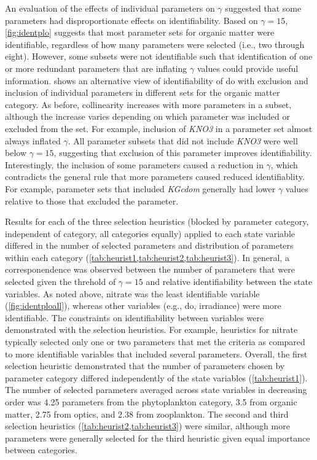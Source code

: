 \documentclass[review]{elsarticle}\usepackage[]{graphicx}\usepackage[]{color}
\begin{document}
An evaluation of the effects of individual parameters on $\gamma$ suggested that some parameters had disproportionate effects on identifiability.  Based on $\gamma = 15$, \cref{fig:identplo} suggests that most parameter sets for organic matter were identifiable, regardless of how many parameters were selected (i.e., two through eight).  However, some subsets were not identifiable such that identification of one or more redundant parameters that are inflating $\gamma$ values could provide useful information.   shows an alternative view of identifiability of \ac{do} with exclusion and inclusion of individual parameters in different sets for the organic matter category.  As before, collinearity increases with more parameters in a subset, although the increase varies depending on which parameter was included or excluded from the set.  For example, inclusion of \textit{KNO3} in a parameter set almost always inflated $\gamma$.  All parameter subsets that did not include \textit{KNO3} were well below $\gamma = 15$, suggesting that exclusion of this parameter improves identifiability.  Interestingly, the inclusion of some parameters caused a reduction in $\gamma$, which contradicts the general rule that more parameters caused reduced identifiablity.  For example, parameter sets that included \textit{KGcdom} generally had lower $\gamma$ values relative to those that excluded the parameter.


Results for each of the three selection heuristics (blocked by parameter category, independent of category, all categories equally) applied to each state variable differed in the number of selected parameters and distribution of parameters within each category (\cref{tab:heurist1,tab:heurist2,tab:heurist3}).  In general, a corresponendence was observed between the number of parameters that were selected given the threhold of $\gamma = 15$ and relative identifiability between the state variables.  As noted above, nitrate was the least identifiable variable (\cref{fig:identploall}), whereas other variables (e.g., \ac{do}, irradiance) were more identifiable.  The constraints on identifiability between variables were demonstrated with the selection heuristics.  For example, heuristics for nitrate typically selected only one or two parameters that met the criteria as compared to more identifiable variables that included several parameters. Overall, the first selection heuristic demonstrated that the number of parameters chosen by parameter category differed independently of the state variables (\cref{tab:heurist1}). The number of selected parameters averaged across state variables in decreasing order was 4.25 parameters from the phytoplankton category, 3.5 from organic matter, 2.75 from optics, and 2.38 from zooplankton. The second and third selection heuristics (\cref{tab:heurist2,tab:heurist3}) were similar, although more parameters were generally selected for the third heuristic given equal importance between categories.
\end{document}

